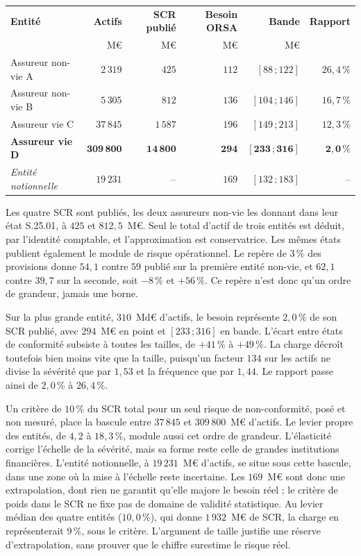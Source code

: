 \begin{center}\small
\renewcommand{\arraystretch}{1.25}
\begin{tabular}{@{}l r r r r r@{}}
\toprule
\textbf{Entité} & \textbf{Actifs} & \textbf{SCR publié} & \textbf{Besoin ORSA} &
\textbf{Bande} & \textbf{Rapport} \\
 & M\euro & M\euro & M\euro & M\euro & \\
\midrule
Assureur non-vie A & $2\,319$ & $425$ & $112$ & $[88\,;122]$ & $26{,}4\,\%$ \\
Assureur non-vie B & $5\,305$ & $812$ & $136$ & $[104\,;146]$ & $16{,}7\,\%$ \\
Assureur vie C & $37\,845$ & $1\,587$ & $196$ & $[149\,;213]$ & $12{,}3\,\%$ \\
\textbf{Assureur vie D} & $\mathbf{309\,800}$ & $\mathbf{14\,800}$ & $\mathbf{294}$ &
$\mathbf{[233\,;316]}$ & $\mathbf{2{,}0\,\%}$ \\
\midrule
\emph{Entité notionnelle} & $19\,231$ & -- & $169$ & $[132\,;183]$ & -- \\
\bottomrule
\end{tabular}
\end{center}

\vspace{2pt}
\noindent Les quatre SCR sont publiés, les deux assureurs non-vie les donnant dans leur état
S.25.01, à $425$ et $812{,}5$~M\euro. Seul le total d'actif de trois entités est déduit, par
l'identité comptable, et l'approximation est conservatrice. Les mêmes états publient également le
module de risque opérationnel. Le repère de $3\,\%$ des provisions donne $54{,}1$ contre $59$ publié
sur la première entité non-vie, et $62{,}1$ contre $39{,}7$ sur la seconde, soit $-8\,\%$ et $+56\,\%$. Ce
repère n'est donc qu'un ordre de grandeur, jamais une borne.

Sur la plus grande entité, $310$~Md\euro{} d'actifs, le besoin représente $2{,}0\,\%$ de son SCR
publié, avec $294$~M\euro{} en point et $[233\,;316]$ en bande. L'écart entre états de conformité
subsiste à toutes les tailles, de $+41\,\%$ à $+49\,\%$. La charge décroît toutefois bien moins vite
que la taille, puisqu'un facteur $134$ sur les actifs ne divise la sévérité que par $1{,}53$ et la
fréquence que par $1{,}44$. Le rapport passe ainsi de $2{,}0\,\%$ à $26{,}4\,\%$.

Un critère de $10\,\%$ du SCR total pour un seul risque de non-conformité, posé et non mesuré, place
la bascule entre $37\,845$ et $309\,800$~M\euro{} d'actifs. Le levier propre des entités, de
$4{,}2$ à $18{,}3\,\%$, module aussi cet ordre de grandeur. L'élasticité corrige l'échelle de la
sévérité, mais sa forme reste celle de grandes institutions financières. L'entité notionnelle, à
$19\,231$~M\euro{} d'actifs, se situe sous cette bascule, dans une zone où la mise à l'échelle reste incertaine. Les $169$~M\euro{} sont donc une extrapolation, dont rien ne garantit qu'elle majore le besoin réel ; le critère de poids dans le SCR ne fixe pas de domaine de validité statistique. Au levier médian des quatre entités ($10{,}0\,\%$), qui donne
$1\,932$~M\euro{} de SCR, la charge en représenterait $9\,\%$, sous le critère. L'argument de taille justifie une réserve d'extrapolation, sans prouver que le chiffre surestime le risque réel.

